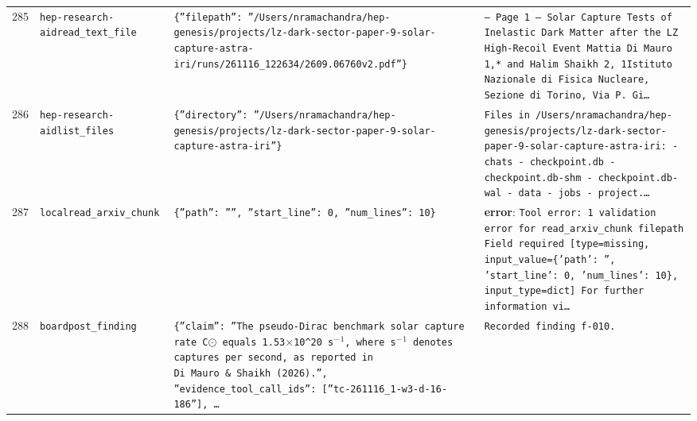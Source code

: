 \documentclass[11pt,a4paper]{article}
\begin{document}
\begin{longtable}{@{}p{}p{}p{}p{}@{}}
285 & \texttt{hep-research-aid}\newline\texttt{read\_\allowbreak{}text\_\allowbreak{}file} & \texttt{\{''filepath'':\allowbreak{} ''/\allowbreak{}Users/\allowbreak{}nramachandra/\allowbreak{}hep-genesis/\allowbreak{}projects/\allowbreak{}lz-dark-sector-paper-9-solar-capture-astra-iri/\allowbreak{}runs/\allowbreak{}261116\_\allowbreak{}122634/\allowbreak{}2609.06760v2.pdf''\}\allowbreak{}} & \texttt{--- Page 1 --- Solar Capture Tests of Inelastic Dark Matter after the LZ High-Recoil Event Mattia Di Mauro 1,\allowbreak{}* and Halim Shaikh 2,\allowbreak{}\dag{}\allowbreak{} 1Istituto Nazionale di Fisica Nucleare,\allowbreak{} Sezione di Torino,\allowbreak{} Via P. Gi\ldots{}\allowbreak{}} \\
286 & \texttt{hep-research-aid}\newline\texttt{list\_\allowbreak{}files} & \texttt{\{''directory'':\allowbreak{} ''/\allowbreak{}Users/\allowbreak{}nramachandra/\allowbreak{}hep-genesis/\allowbreak{}projects/\allowbreak{}lz-dark-sector-paper-9-solar-capture-astra-iri''\}\allowbreak{}} & \texttt{Files in /\allowbreak{}Users/\allowbreak{}nramachandra/\allowbreak{}hep-genesis/\allowbreak{}projects/\allowbreak{}lz-dark-sector-paper-9-solar-capture-astra-iri:\allowbreak{}   - chats   - checkpoint.db   - checkpoint.db-shm   - checkpoint.db-wal   - data   - jobs   - project.\ldots{}\allowbreak{}} \\
287 & \texttt{local}\newline\texttt{read\_\allowbreak{}arxiv\_\allowbreak{}chunk} & \texttt{\{''path'':\allowbreak{} '''',\allowbreak{} ''start\_\allowbreak{}line'':\allowbreak{} 0,\allowbreak{} ''num\_\allowbreak{}lines'':\allowbreak{} 10\}\allowbreak{}} & \textbf{error}: \texttt{Tool error:\allowbreak{} 1 validation error for read\_\allowbreak{}arxiv\_\allowbreak{}chunk filepath   Field required [type=\allowbreak{}missing,\allowbreak{} input\_\allowbreak{}value=\allowbreak{}\{'path':\allowbreak{} '',\allowbreak{} 'start\_\allowbreak{}line':\allowbreak{} 0,\allowbreak{} 'num\_\allowbreak{}lines':\allowbreak{} 10\}\allowbreak{},\allowbreak{} input\_\allowbreak{}type=\allowbreak{}dict]\allowbreak{}     For further information vi\ldots{}\allowbreak{}} \\
288 & \texttt{board}\newline\texttt{post\_\allowbreak{}finding} & \texttt{\{''claim'':\allowbreak{} ''The pseudo-Dirac benchmark solar capture rate C$\odot$ equals 1.53$\times$10\textasciicircum{}\allowbreak{}20 s$^-$$^1$,\allowbreak{} where s$^-$$^1$ denotes captures per second,\allowbreak{} as reported in Di~Mauro~\&~Shaikh (2026)\allowbreak{}.'',\allowbreak{} ''evidence\_\allowbreak{}tool\_\allowbreak{}call\_\allowbreak{}ids'':\allowbreak{} [''tc-261116\_\allowbreak{}1-w3-d-16-186'']\allowbreak{},\allowbreak{} \ldots{}\allowbreak{}} & \texttt{Recorded finding f-010.} \\

\end{longtable}
\end{document}
